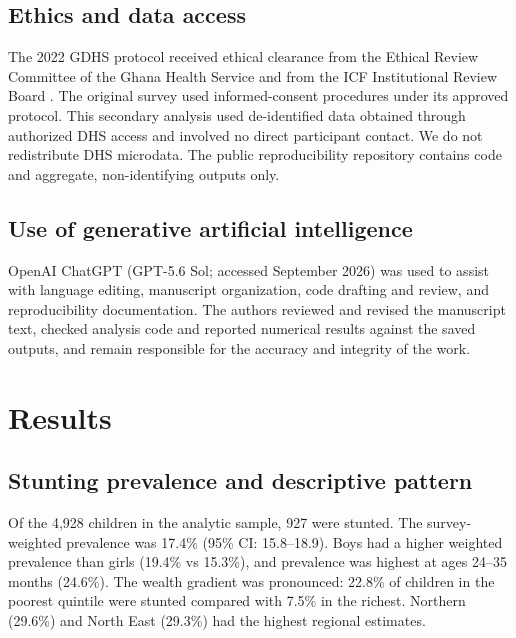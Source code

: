 \documentclass[11pt]{article}
\begin{document}
\subsection{Ethics and data access}

The 2022 GDHS protocol received ethical clearance from the Ethical Review Committee of the Ghana Health Service and from the ICF Institutional Review Board \citep{GSSICF2024}. The original survey used informed-consent procedures under its approved protocol. This secondary analysis used de-identified data obtained through authorized DHS access and involved no direct participant contact. We do not redistribute DHS microdata. The public reproducibility repository contains code and aggregate, non-identifying outputs only.

\subsection{Use of generative artificial intelligence}

OpenAI ChatGPT (GPT-5.6 Sol; accessed September 2026) was used to assist with language editing, manuscript organization, code drafting and review, and reproducibility documentation. The authors reviewed and revised the manuscript text, checked analysis code and reported numerical results against the saved outputs, and remain responsible for the accuracy and integrity of the work.

\section{Results}

\subsection{Stunting prevalence and descriptive pattern}

Of the 4,928 children in the analytic sample, 927 were stunted. The survey-weighted prevalence was 17.4\% (95\% CI: 15.8--18.9). Boys had a higher weighted prevalence than girls (19.4\% vs 15.3\%), and prevalence was highest at ages 24--35 months (24.6\%). The wealth gradient was pronounced: 22.8\% of children in the poorest quintile were stunted compared with 7.5\% in the richest. Northern (29.6\%) and North East (29.3\%) had the highest regional estimates.
\end{document}

